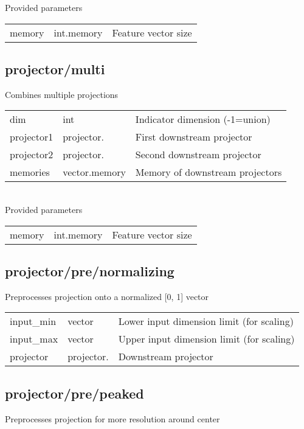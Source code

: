 \noindent Provided parameters\\

\noindent\begin{tabular}{@{}lll@{}}
memory&int.memory&Feature vector size\\
\end{tabular}
\subsection{projector/multi}
\noindent Combines multiple projections\\

\noindent\begin{tabular}{@{}lll@{}}
dim&int&Indicator dimension (-1=union)\\
projector1&projector.&First downstream projector\\
projector2&projector.&Second downstream projector\\
memories&vector.memory&Memory of downstream projectors\\
\end{tabular}
\\

\noindent Provided parameters\\

\noindent\begin{tabular}{@{}lll@{}}
memory&int.memory&Feature vector size\\
\end{tabular}
\subsection{projector/pre/normalizing}
\noindent Preprocesses projection onto a normalized [0, 1] vector\\

\noindent\begin{tabular}{@{}lll@{}}
input\_min&vector&Lower input dimension limit (for scaling)\\
input\_max&vector&Upper input dimension limit (for scaling)\\
projector&projector.&Downstream projector\\
\end{tabular}
\subsection{projector/pre/peaked}
\noindent Preprocesses projection for more resolution around center\\

